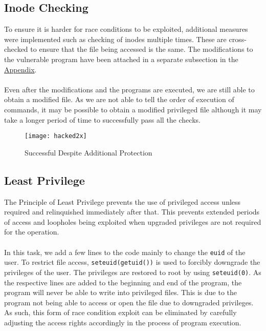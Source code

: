 \documentclass[a4paper,12pt]{article}
\begin{document}
\subsection{Inode Checking}
To ensure it is harder for race conditions to be exploited, additional measures were implemented such as checking of inodes multiple times. These are cross-checked to ensure that the file being accessed is the same. The modifications to the vulnerable program have been attached in a separate subsection in the \hyperref[Appsec:3.3]{Appendix}.\\\\Even after the modifications and the programs are executed, we are still able to obtain a modified file. As we are not able to tell the order of execution of commands, it may be possible to obtain a modified privileged file although it may take a longer period of time to successfully pass all the checks.
\begin{figure}[H]
	\centering
	\texttt{[image: hacked2x]}
	\caption{Successful Despite Additional Protection}
	\label{fig:hacked2x}
\end{figure}
\subsection{Least Privilege}
The Principle of Least Privilege prevents the use of privileged access unless required and relinquished immediately after that. This prevents extended periods of access and loopholes being exploited when upgraded privileges are not required for the operation.\\\\In this task, we add a few lines to the code mainly to change the \texttt{euid} of the user. To restrict file access, \texttt{seteuid(getuid())} is used to forcibly downgrade the privileges of the user. The privileges are restored to root by using \texttt{seteuid(0)}. As the respective lines are added to the beginning and end of the program, the program will never be able to write into privileged files. This is due to the program not being able to access or open the file due to downgraded privileges. As such, this form of race condition exploit can be eliminated by carefully adjusting the access rights accordingly in the process of program execution.
\end{document}
